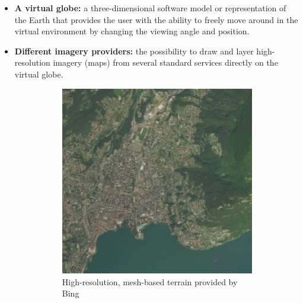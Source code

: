 \begin{itemize}
	\item {\bf A virtual globe:} a three-dimensional software model or representation of the Earth that provides the user with the ability to freely move around in the virtual environment by changing the viewing angle and position.
	\item {\bf Different imagery providers:} the possibility to draw and layer high-resolution imagery (maps) from several standard services directly on the virtual globe. 
	\begin{figure} [h]
		\centering
		\begin{subfigure}[b]{0.3\textwidth}
			\includegraphics[width=1\textwidth]{chapter2/images/Bing-Map}
			\caption{High-resolution, mesh-based terrain provided by Bing}
			\label{fig:Bing-Map}
		\end{subfigure}
		 \qquad
		\begin{subfigure}[b]{0.3\textwidth}

\end{subfigure}
\end{figure}
\end{itemize}
